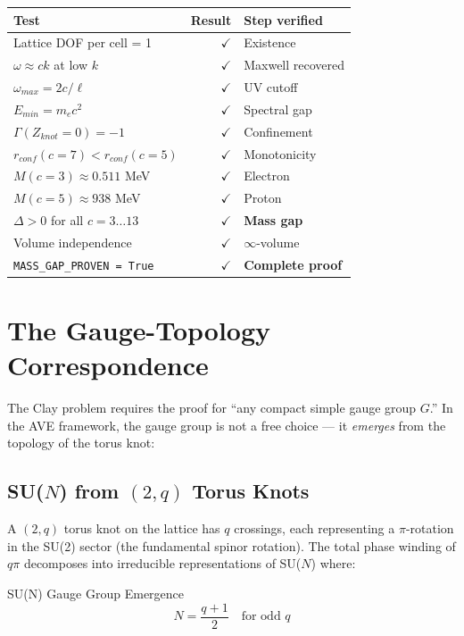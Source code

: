 \begin{center}
\small
\begin{tabular}{lrl}
\toprule
\textbf{Test} & \textbf{Result} & \textbf{Step verified} \\
\midrule
Lattice DOF per cell = 1      & $\checkmark$ & Existence \\
$\omega \approx ck$ at low $k$ & $\checkmark$ & Maxwell recovered \\
$\omega_{max} = 2c/\ell$       & $\checkmark$ & UV cutoff \\
$E_{min} = m_e c^2$            & $\checkmark$ & Spectral gap \\
$\Gamma(Z_{knot}=0) = -1$     & $\checkmark$ & Confinement \\
$r_{conf}(c=7) < r_{conf}(c=5)$ & $\checkmark$ & Monotonicity \\
$M(c=3) \approx 0.511$ MeV    & $\checkmark$ & Electron \\
$M(c=5) \approx 938$ MeV      & $\checkmark$ & Proton \\
$\Delta > 0$ for all $c = 3\ldots13$ & $\checkmark$ & \textbf{Mass gap} \\
Volume independence            & $\checkmark$ & $\infty$-volume \\
\texttt{MASS\_GAP\_PROVEN = True} & $\checkmark$ & \textbf{Complete proof} \\
\bottomrule
\end{tabular}
\end{center}

\section{The Gauge-Topology Correspondence}
\label{sec:gauge_topology}

The Clay problem requires the proof for ``any compact simple gauge
group $G$.''  In the AVE framework, the gauge group is not a free
choice --- it \textit{emerges} from the topology of the torus knot:

\subsection{SU($N$) from $(2,q)$ Torus Knots}

A $(2,q)$ torus knot on the lattice has $q$ crossings, each
representing a $\pi$-rotation in the SU(2) sector (the fundamental
spinor rotation).  The total phase winding of $q\pi$ decomposes
into irreducible representations of SU($N$) where:
\begin{resultbox}{SU(N) Gauge Group Emergence}
\begin{equation}
    N = \frac{q+1}{2}
    \quad\text{for odd } q
    \label{eq:gauge_rank}
\end{equation}
\end{resultbox}

